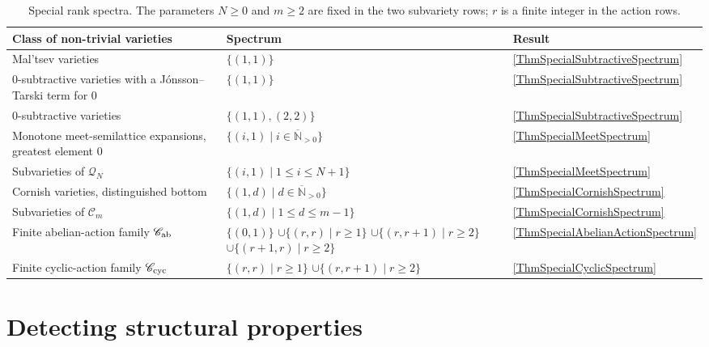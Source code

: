 \documentclass[12pt,english]{amsart}
\theoremstyle{definition}
\numberwithin{equation}{section}
\theoremstyle{remark}
\begin{document}
\begin{table}[H]
\centering
\small
\setlength{\tabcolsep}{5pt}
\renewcommand{\arraystretch}{1.0}
\caption{Special rank spectra. The parameters $N\geqslant0$ and
$m\geqslant2$ are fixed in the two subvariety rows; $r$ is a finite
integer in the action rows.}
\label{TabSpecialSpectra}
\begin{tabular}{@{}p{}p{}l@{}}
\toprule
Class of non-trivial varieties & Spectrum & Result\\
\midrule
Mal'tsev varieties
 & $\{(1,1)\}$ & \ref{ThmSpecialSubtractiveSpectrum}\\
$0$-subtractive varieties with a J\'onsson--Tarski term for $0$
 & $\{(1,1)\}$ & \ref{ThmSpecialSubtractiveSpectrum}\\
$0$-subtractive varieties
 & $\{(1,1),(2,2)\}$ & \ref{ThmSpecialSubtractiveSpectrum}\\
Monotone meet-semilattice expansions, greatest element $0$
 & $\{(i,1)\mid i\in\overline{\mathbb N}_{>0}\}$ & \ref{ThmSpecialMeetSpectrum}\\
Subvarieties of $\mathcal Q_N$
 & $\{(i,1)\mid 1\leqslant i\leqslant N+1\}$ & \ref{ThmSpecialMeetSpectrum}\\
Cornish varieties, distinguished bottom
 & $\{(1,d)\mid d\in\overline{\mathbb N}_{>0}\}$ & \ref{ThmSpecialCornishSpectrum}\\
Subvarieties of $\mathcal C_m$
 & $\{(1,d)\mid 1\leqslant d\leqslant m-1\}$ & \ref{ThmSpecialCornishSpectrum}\\
Finite abelian-action family $\mathscr C_{\rm ab}$
 & $\{(0,1)\}$\newline
   $\cup\{(r,r)\mid r\geqslant1\}$\newline
   $\cup\{(r,r+1)\mid r\geqslant2\}$\newline
   $\cup\{(r+1,r)\mid r\geqslant2\}$
 & \ref{ThmSpecialAbelianActionSpectrum}\\
Finite cyclic-action family $\mathscr C_{\rm cyc}$
 & $\{(r,r)\mid r\geqslant1\}$\newline
   $\cup\{(r,r+1)\mid r\geqslant2\}$
 & \ref{ThmSpecialCyclicSpectrum}\\
\bottomrule
\end{tabular}
\end{table}

\section{Detecting structural properties}\label{SecDetection}
\end{document}
